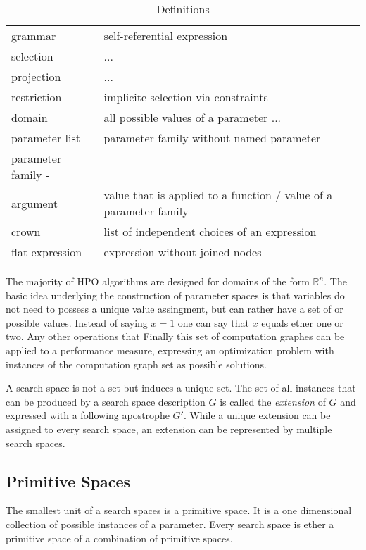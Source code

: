 \documentclass[english]{article}
\begin{document}
\begin{table}
\begin{tabular}{| l | l |}
    grammar & self-referential expression \\
    selection & ... \\
    projection & ... \\
    restriction & implicite selection via constraints \\
    domain & all possible values of a parameter ... \\
    parameter list & parameter family without named parameter \\
    parameter family - \\
    argument & value that is applied to a function / value of a parameter family \\
    crown & list of independent choices of an expression \\
    flat expression & expression without joined nodes \\
    \hline
  \end{tabular}
  \caption{Definitions}
  \label{definitions}

\end{table}



The majority of \ac{HPO} algorithms are designed for domains of the form $\mathbb{R}^n$.
The basic idea underlying the construction of parameter spaces is that variables do not need to possess a unique value assingment, but can rather have a set of or possible values. Instead of saying $x = 1$ one can say that $x$ equals ether one or two. Any other operations that Finally this set of computation graphes can be applied to a performance measure, expressing an optimization problem with instances of the computation graph set as possible solutions.

A search space is not a set but induces a unique set. The set of all instances that can be produced by a search space description $G$ is called the \textit{extension} of $G$ and expressed with a following apostrophe $G'$. While a unique extension can be assigned to every search space, an extension can be represented by multiple search spaces.

\subsection{Primitive Spaces}
The smallest unit of a search spaces is a primitive space. It is a one dimensional collection of possible instances of a parameter. Every search space is ether a primitive space of a combination of primitive spaces.
\end{document}
